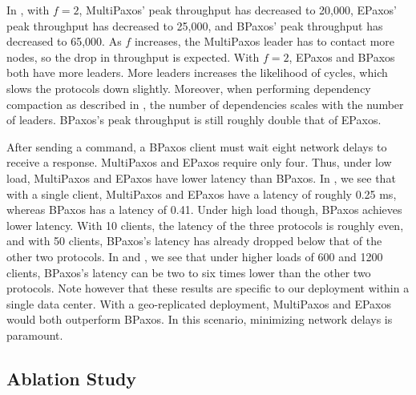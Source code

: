 In , with $f=2$, MultiPaxos' peak throughput has decreased to
20,000, EPaxos' peak throughput has decreased to 25,000, and BPaxos' peak
throughput has decreased to 65,000. As $f$ increases, the MultiPaxos leader has
to contact more nodes, so the drop in throughput is expected. With $f=2$,
EPaxos and BPaxos both have more leaders. More leaders increases the likelihood
of cycles, which slows the protocols down slightly. Moreover, when performing
dependency compaction as described in , the
number of dependencies scales with the number of leaders. BPaxos's peak
throughput is still roughly double that of EPaxos.


After sending a command, a BPaxos client must wait eight network delays to
receive a response. MultiPaxos and EPaxos require only four. Thus, under low
load, MultiPaxos and EPaxos have lower latency than BPaxos. In
, we see that with a single client, MultiPaxos and EPaxos
have a latency of roughly 0.25 ms, whereas BPaxos has a latency of 0.41. Under
high load though, BPaxos achieves lower latency. With 10 clients, the latency
of the three protocols is roughly even, and with 50 clients, BPaxos's latency
has already dropped below that of the other two protocols. In 
and , we see that under higher loads of 600 and 1200 clients,
BPaxos's latency can be two to six times lower than the other two protocols.
Note however that these results are specific to our deployment within a single
data center. With a geo-replicated deployment, MultiPaxos and EPaxos would both
outperform BPaxos. In this scenario, minimizing network delays is paramount.


\subsection{Ablation Study}
{}

